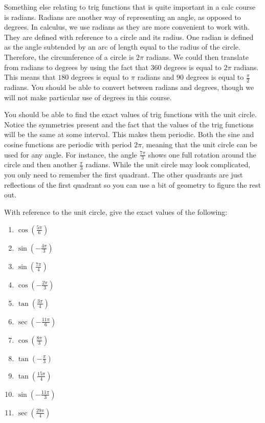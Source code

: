 \documentclass[12pt]{article}
\begin{document}
Something else relating to trig functions that is quite important in a calc course is radians.
Radians are another way of representing an angle, as opposed to degrees.
In calculus, we use radians as they are more convenient to work with.
They are defined with reference to a circle and its radius.
One radian is defined as the angle subtended by an arc of length equal to the radius of the circle.
Therefore, the circumference of a circle is $2\pi$ radians.
We could then translate from radians to degrees by using the fact that $360$ degrees is equal to $2\pi$ radians.
This means that $180$ degrees is equal to $\pi$ radians and $90$ degrees is equal to $\frac{\pi}{2}$ radians.
You should be able to convert between radians and degrees, though we will not make particular use of degrees in this course.

You should be able to find the exact values of trig functions with the unit circle.
Notice the symmetries present and the fact that the values of the trig functions will be the same at some interval.
This makes them periodic.
Both the sine and cosine functions are periodic with period $2\pi$, meaning that the unit circle can be used for any angle.
For instance, the angle $\frac{7\pi}{3}$ shows one full rotation around the circle and then another $\frac{\pi}{3}$ radians.
While the unit circle may look complicated, you only need to remember the first quadrant.
The other quadrants are just reflections of the first quadrant so you can use a bit of geometry to figure the rest out.

With reference to the unit circle, give the exact values of the following:

\begin{enumerate}
    \item $\displaystyle \cos \left( {\frac{{5\pi }}{6}} \right)$
    \item $\displaystyle \sin \left( { - \frac{{4\pi }}{3}} \right)$
    \item $\displaystyle \sin \left( {\frac{{7\pi }}{4}} \right)$
    \item $\displaystyle \cos \left( { - \frac{{2\pi }}{3}} \right)$
    \item $\displaystyle \tan \left( {\frac{{3\pi }}{4}} \right)$
    \item $\displaystyle \sec \left( { - \frac{{11\pi }}{6}} \right)$
    \item $\displaystyle \cos \left( {\frac{{8\pi }}{3}} \right)$
    \item $\displaystyle \tan \left( { - \frac{\pi }{3}} \right)$
    \item $\displaystyle \tan \left( {\frac{{15\pi }}{4}} \right)$
    \item $\displaystyle \sin \left( { - \frac{{11\pi }}{3}} \right)$
    \item $\displaystyle \sec \left( {\frac{{29\pi }}{4}} \right)$
\end{enumerate}
\end{document}
